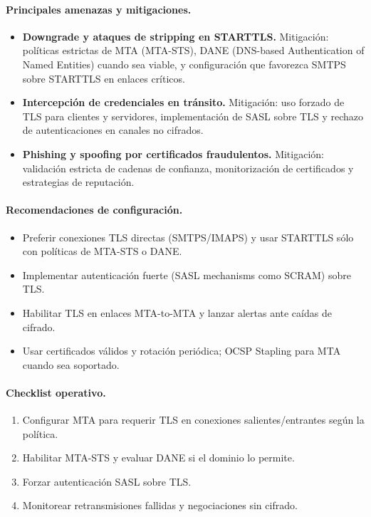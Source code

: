 \paragraph{Principales amenazas y mitigaciones.}
\begin{itemize}
    \item \textbf{Downgrade y ataques de stripping en STARTTLS.} Mitigación: políticas estrictas de MTA (MTA-STS), DANE (DNS-based Authentication of Named Entities) cuando sea viable, y configuración que favorezca SMTPS sobre STARTTLS en enlaces críticos.
    \item \textbf{Intercepción de credenciales en tránsito.} Mitigación: uso forzado de TLS para clientes y servidores, implementación de SASL sobre TLS y rechazo de autenticaciones en canales no cifrados.
    \item \textbf{Phishing y spoofing por certificados fraudulentos.} Mitigación: validación estricta de cadenas de confianza, monitorización de certificados y estrategias de reputación.
\end{itemize}

\paragraph{Recomendaciones de configuración.}
\begin{itemize}
    \item Preferir conexiones TLS directas (SMTPS/IMAPS) y usar STARTTLS sólo con políticas de MTA-STS o DANE.
    \item Implementar autenticación fuerte (SASL mechanisms como SCRAM) sobre TLS.
    \item Habilitar TLS en enlaces MTA-to-MTA y lanzar alertas ante caídas de cifrado.
    \item Usar certificados válidos y rotación periódica; OCSP Stapling para MTA cuando sea soportado.
\end{itemize}

\paragraph{Checklist operativo.}
\begin{enumerate}
    \item Configurar MTA para requerir TLS en conexiones salientes/entrantes según la política.
    \item Habilitar MTA-STS y evaluar DANE si el dominio lo permite.
    \item Forzar autenticación SASL sobre TLS.
    \item Monitorear retransmisiones fallidas y negociaciones sin cifrado.
\end{enumerate}


